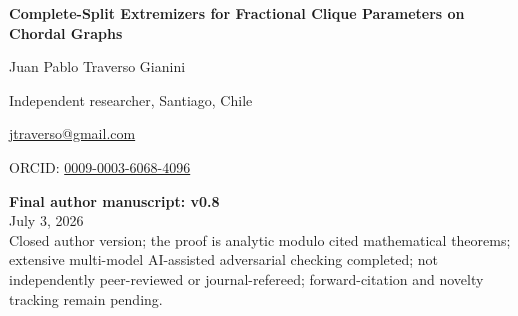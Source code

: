 \documentclass[11pt,a4paper]{article}
\newcommand{\statusblock}{%
\begin{center}
\small
\textbf{Final author manuscript: v0.8}\\
July 3, 2026\\
Closed author version; the proof is analytic modulo cited mathematical theorems; extensive multi-model AI-assisted adversarial checking completed; not independently peer-reviewed or journal-refereed; forward-citation and novelty tracking remain pending.
\end{center}}
\begin{document}
\begin{titlepage}
\centering
\vspace*{2.2cm}
{\sffamily\bfseries\fontsize{22}{27}\selectfont Complete-Split Extremizers for Fractional Clique Parameters on Chordal Graphs\par}
\vspace{1.5cm}
{\Large Juan Pablo Traverso Gianini\par}
\vspace{0.35cm}
{\normalsize Independent researcher, Santiago, Chile\par}
\vspace{0.2cm}
{\normalsize \href{mailto:jtraverso@gmail.com}{jtraverso@gmail.com}\par}
{\normalsize ORCID: \href{https://orcid.org/0009-0003-6068-4096}{0009-0003-6068-4096}\par}
\vfill
\statusblock
\vfill
\end{titlepage}
\setcounter{page}{1}
\end{document}
